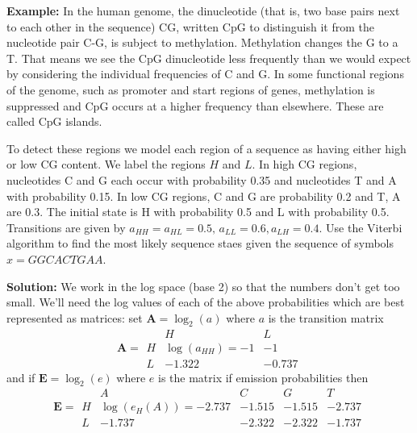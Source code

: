 \documentclass[11pt]{article}
\begin{document}
{\bf Example:}   In the human genome, the dinucleotide (that is, two base pairs next to each other in the sequence) CG, written CpG to distinguish it from the nucleotide pair C-G, is subject to methylation.  Methylation changes the G to a T.  That means we see the CpG dinucleotide less frequently than we would expect by considering the individual frequencies of C and G.  In some functional regions of the genome, such as promoter and start regions of genes,  methylation is suppressed and CpG occurs at a higher frequency than elsewhere.  These are called CpG islands.


To detect these regions we model each region of a sequence as having either high or low CG content.  We label the regions $H$ and $L$.  In high CG regions, nucleotides C and G each occur with probability 0.35 and nucleotides T and A with probability 0.15.  In low CG regions, C and G are probability 0.2 and T, A are 0.3.   The initial state is H with probability 0.5 and L with probability 0.5.  Transitions are given by $a_{HH} = a_{HL} = 0.5, \, a_{LL} = 0.6, a_{LH} = 0.4$.  Use the Viterbi algorithm to find the most likely sequence staes given the sequence of symbols $x = GGCACTGAA$.

{\bf Solution:} We work in the log space (base 2) so that the numbers don't get too small.  We'll need the log values of each of the above probabilities which are best represented as matrices: set $\mathbf A = \log_2(a)$ where $a$ is the transition matrix 
\[\mathbf A = \begin{array}{ccc}
& H & L \\
H & \log(a_{HH}) =   -1 & -1 \\
L & -1.322 & -0.737
\end{array}
\]
and if $\mathbf E = \log_2(e)$ where $e$ is the matrix if emission probabilities then 
\[\mathbf E = \begin{array}{ccccc}
& A & C&G&T\\
H & \log(e_H(A)) =   -2.737 & -1.515 & -1.515 &  -2.737 \\
L & -1.737 & -2.322 & -2.322 & -1.737
\end{array}
\]


\end{document}
